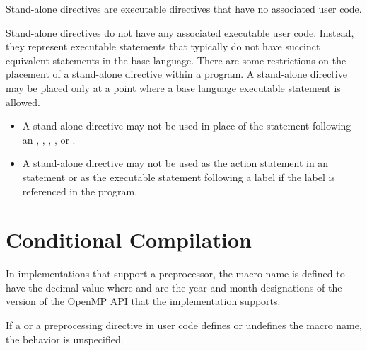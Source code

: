 \summary
Stand-alone directives are executable directives that have no associated user code.

\descr
Stand-alone directives do not have any associated executable user code. Instead, 
they represent executable statements that typically do not have succinct equivalent 
statements in the base language. There are some restrictions on the placement of a 
stand-alone directive within a program. A stand-alone directive may be placed only 
at a point where a base language executable statement is allowed.

\restrictions
\begin{ccppspecific}
\begin{itemize}
    \item A stand-alone directive may not be used in place of the statement following
          an , , , , or .
\end{itemize}
\end{ccppspecific}

\begin{fortranspecific}
\begin{itemize}
    \item A stand-alone directive may not be used as the action statement in an 
           statement or as the executable statement following a label 
          if the label is referenced in the program.
\end{itemize}
\end{fortranspecific}


\section{Conditional Compilation}
\label{sec:Conditional Compilation}

In implementations that support a preprocessor, the  macro name is 
defined to have the decimal value  where  and  are 
the year and month designations of the version of the OpenMP API that the 
implementation supports.

If a  or a  preprocessing directive in user
code defines or undefines the  macro name, the behavior is
unspecified.

